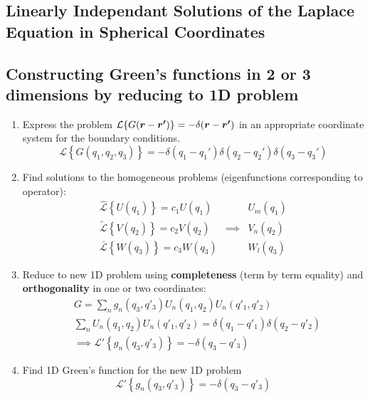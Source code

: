 \subsection{Linearly Independant Solutions of the Laplace Equation in Spherical Coordinates}
\subsection{Constructing Green's functions in 2 or 3 dimensions by reducing to 1D problem}
\begin{enumerate}
  \item Express the problem $\mathcal{L}\{G(\boldsymbol{r}-\boldsymbol{r'})\} = -\delta(\boldsymbol{r}-\boldsymbol{r'})$ in an appropriate coordinate system for the boundary conditions.
        \begin{equation*}
          \mathcal{L}\left\{G(q_{1}, q_{2}, q_{3})\right\} = -\delta(q_{1}-q_{1}') \delta(q_{2}-q_{2}') \delta(q_{3}-q_{3}')
        \end{equation*}
  \item Find solutions to the homogeneous problems (eigenfunctions corresponding to operator):
        \begin{align*}
          \mathcal{\hat{L}} \left\{U(q_{1})\right\} = c_{1}U(q_{1}) & & U_{m}(q_{1})\\
          \mathcal{\tilde{L}} \left\{V(q_{2})\right\} = c_{2}V(q_{2}) & \implies & V_{n}(q_{2})\\
          \mathcal{\bar{L}} \left\{W(q_{3})\right\} = c_{3}W(q_{3}) & & W_{l}(q_{3})
        \end{align*}
  \item Reduce to new 1D problem using \textbf{completeness} (term by term equality) and \textbf{orthogonality} in one or two coordinates:
        \begin{align*}
          &G = \sum\limits_{n} g_{n}(q_{3},q'_{3}) U_{n}(q_{1},q_{2})U_{n}(q'_{1},q'_{2})\\
          &\sum\limits_{n} U_{n}(q_{1},q_{2}) U_{n}(q'_{1},q'_{2}) = \delta(q_{1}-q'_{1})\delta(q_{2}-q'_{2})\\
          &\implies \mathcal{L'}\left\{g_{n}(q_{3},q'_{3})\right\} = -\delta(q_{3}-q'_{3})
        \end{align*}
  \item Find 1D Green's function for the new 1D problem
        \begin{equation*}
          \mathcal{L'}\left\{g_{n}(q_{3},q'_{3})\right\} = -\delta(q_{3}-q'_{3})
        \end{equation*}
\end{enumerate}

